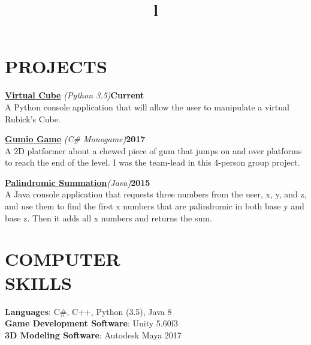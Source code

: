 \documentclass[line,margin]{res}
\begin{document}
\begin{resume}
\section{PROJECTS}
\par
    \href{https://github.com/MaeveMonster/VirtualCube}{\textbf{Virtual Cube}}
    {\sl (Python 3.5)}\hfill \textbf{Current}\\ 
    A Python console application that will allow the user to manipulate a virtual 
	Rubick's Cube.
\par
    \href{https://github.com/MaeveMonster/GumioGame}{\textbf{Gumio Game}}
    {\sl (C\# Monogame)}\hfill \textbf{2017}\\ 
    A 2D platformer about a chewed piece of gum that jumps on and over platforms to 
	reach the end of the level. I was the team-lead in this 4-person group project.
\par
    \href{https://github.com/MaeveMonster/PalindromicSummation}
    {\textbf{Palindromic Summation}}{\sl (Java)}\hfill \textbf{2015}\\
    A Java console application that requests three numbers from the user, x, y, 
	and z, and use them to find the first x numbers that are palindromic 
	in both base y and base z. Then it adds all x numbers and returns the sum.

\section{COMPUTER\\SKILLS}
\textbf{Languages}: C\#, C++, Python (3.5), Java 8\\
\textbf{Game Development Software}: Unity 5.60f3\\
\textbf{3D Modeling Software}: Autodesk Maya 2017

\begin{format}
\title{l}\\
\\
\body\\
\end{format}

\end{resume}
\end{document}

